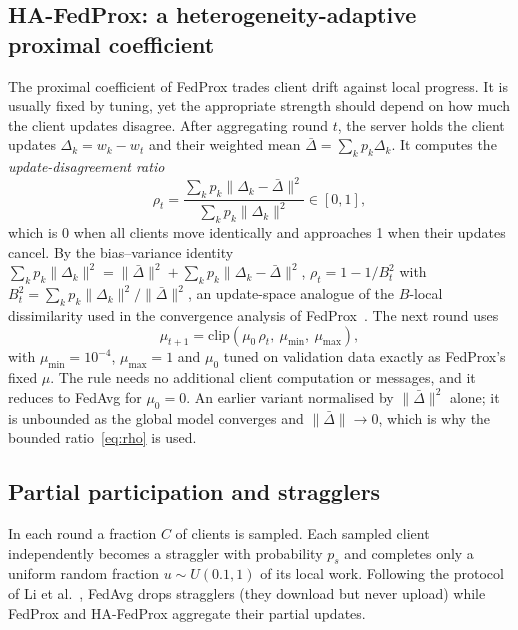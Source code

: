 \subsection{HA-FedProx: a heterogeneity-adaptive proximal coefficient}\label{sec:ha}
The proximal coefficient of FedProx trades client drift against local progress. It is usually fixed by tuning,
yet the appropriate strength should depend on how much the client updates disagree. After aggregating round $t$,
the server holds the client updates $\Delta_k=w_k-w_t$ and their weighted mean $\bar\Delta=\sum_k p_k\Delta_k$.
It computes the \emph{update-disagreement ratio}
\begin{equation}\label{eq:rho}
\rho_t=\frac{\sum_k p_k\lVert\Delta_k-\bar\Delta\rVert^2}{\sum_k p_k\lVert\Delta_k\rVert^2}\in[0,1],
\end{equation}
which is 0 when all clients move identically and approaches 1 when their updates cancel. By the
bias--variance identity $\sum_k p_k\lVert\Delta_k\rVert^2=\lVert\bar\Delta\rVert^2+\sum_k p_k\lVert\Delta_k-\bar\Delta\rVert^2$,
$\rho_t=1-1/B_t^2$ with $B_t^2=\sum_k p_k\lVert\Delta_k\rVert^2/\lVert\bar\Delta\rVert^2$, an update-space analogue of
the $B$-local dissimilarity used in the convergence analysis of FedProx~\cite{li2020fedprox}. The next round uses
\begin{equation}
\mu_{t+1}=\mathrm{clip}\!\left(\mu_0\,\rho_t,\ \mu_{\min},\ \mu_{\max}\right),
\end{equation}
with $\mu_{\min}=10^{-4}$, $\mu_{\max}=1$ and $\mu_0$ tuned on validation data exactly as FedProx's fixed $\mu$. The
rule needs no additional client computation or messages, and it reduces to FedAvg for $\mu_0=0$. An earlier variant
normalised by $\lVert\bar\Delta\rVert^2$ alone; it is unbounded as the global model converges and
$\lVert\bar\Delta\rVert\to0$, which is why the bounded ratio~\eqref{eq:rho} is used.

\subsection{Partial participation and stragglers}
In each round a fraction $C$ of clients is sampled. Each sampled client independently becomes a straggler with
probability $p_s$ and completes only a uniform random fraction $u\sim U(0.1,1)$ of its local work. Following the
protocol of Li et al.~\cite{li2020fedprox}, FedAvg drops stragglers (they download but never upload) while FedProx
and HA-FedProx aggregate their partial updates.

